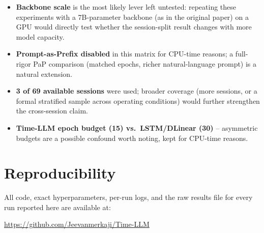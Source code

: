 \documentclass[11pt]{article}
\begin{document}
\begin{itemize}
  \item \textbf{Backbone scale} is the most likely lever left untested:
    repeating these experiments with a 7B-parameter backbone (as in the
    original paper) on a GPU would directly test whether the session-split
    result changes with more model capacity.
  \item \textbf{Prompt-as-Prefix disabled} in this matrix for CPU-time
    reasons; a full-rigor PaP comparison (matched epochs, richer
    natural-language prompt) is a natural extension.
  \item \textbf{3 of 69 available sessions} were used; broader coverage (more
    sessions, or a formal stratified sample across operating conditions)
    would further strengthen the cross-session claim.
  \item \textbf{Time-LLM epoch budget (15) vs.\ LSTM/DLinear (30)} --
    asymmetric budgets are a possible confound worth noting, kept for
    CPU-time reasons.
\end{itemize}

\section{Reproducibility}

All code, exact hyperparameters, per-run logs, and the raw results file for
every run reported here are available at:
\begin{center}
\url{https://github.com/Jeevanmerkaji/Time-LLM}
\end{center}



\end{document}
